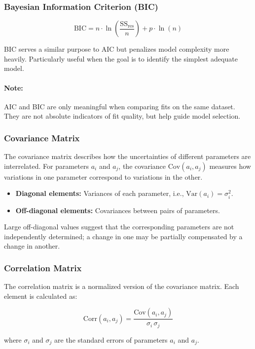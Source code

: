 \subsubsection*{Bayesian Information Criterion (BIC)}

\[
\mathrm{BIC} = n \cdot \ln\left(\frac{\mathrm{SS}_{\mathrm{res}}}{n}\right) + p \cdot \ln(n)
\]

BIC serves a similar purpose to AIC but penalizes model complexity more heavily. Particularly useful when the goal is to identify the simplest adequate model.
\paragraph{Note:} AIC and BIC are only meaningful when comparing fits on the same dataset. They are not absolute indicators of fit quality, but help guide model selection.

\subsubsection*{Covariance Matrix}

The covariance matrix describes how the uncertainties of different parameters are interrelated. For parameters $a_i$ and $a_j$, the covariance $\mathrm{Cov}(a_i, a_j)$ measures how variations in one parameter correspond to variations in the other.

\begin{itemize}
    \item \textbf{Diagonal elements:} Variances of each parameter, i.e., $\mathrm{Var}(a_i) = \sigma_i^2$.
    \item \textbf{Off-diagonal elements:} Covariances between pairs of parameters.
\end{itemize}

Large off-diagonal values suggest that the corresponding parameters are not independently determined; a change in one may be partially compensated by a change in another.

\subsubsection*{Correlation Matrix}

The correlation matrix is a normalized version of the covariance matrix. Each element is calculated as:

\[
\mathrm{Corr}(a_i, a_j) = \frac{\mathrm{Cov}(a_i, a_j)}{\sigma_i \, \sigma_j}
\]

where $\sigma_i$ and $\sigma_j$ are the standard errors of parameters $a_i$ and $a_j$.

